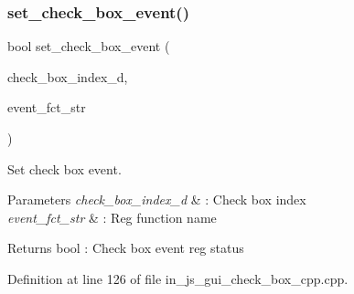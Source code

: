 \subsubsection{set\_check\_box\_event()}
{\footnotesize\ttfamily bool set\+\_\+check\+\_\+box\+\_\+event (\begin{DoxyParamCaption}\item[{double}]{check\+\_\+box\+\_\+index\+\_\+d,  }\item[{wx\+String}]{event\+\_\+fct\+\_\+str }\end{DoxyParamCaption})}



Set check box event. 


\begin{DoxyParams}{Parameters}
{\em check\+\_\+box\+\_\+index\+\_\+d} & \+: Check box index \\
\hline
{\em event\+\_\+fct\+\_\+str} & \+: Reg function name \\
\hline
\end{DoxyParams}
\begin{DoxyReturn}{Returns}
bool \+: Check box event reg status 
\end{DoxyReturn}


Definition at line 126 of file in\+\_\+js\+\_\+gui\+\_\+check\+\_\+box\+\_\+cpp.\+cpp.

